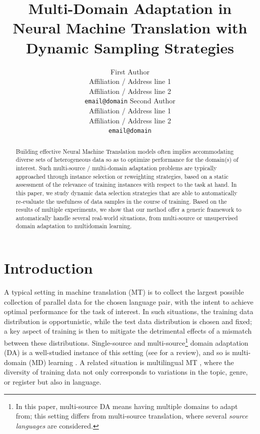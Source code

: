 \documentclass[11pt]{article}
\title{Multi-Domain Adaptation in Neural Machine Translation with Dynamic Sampling Strategies}
\author{First Author\\
  Affiliation / Address line 1\\
  Affiliation / Address line 2\\
  {\tt email@domain}  \And
  Second Author\\
  Affiliation / Address line 1\\
  Affiliation / Address line 2\\
  {\tt email@domain}}
\date{}
\newcommand{\fyDone}[1]{\done[FY]\Todo[FY:]{\textcolor{orange}{#1}}}
\newcommand{\revision}[1]{\textcolor{red}{#1}}
\begin{document}
\maketitle
\setlength{\abovedisplayskip}{2pt}
\setlength{\belowdisplayskip}{2pt}
\begin{abstract}
  Building effective Neural Machine Translation models often implies accommodating diverse sets of heterogeneous data so as to optimize performance for the domain(s) of interest. Such multi-source / multi-domain adaptation problems are typically approached through instance selection or reweighting strategies, based on a static assessment of the relevance of training instances with respect to the task at hand. In this paper, we study dynamic data selection strategies that are able to automatically re-evaluate the usefulness of data samples
  in the course of training. Based on the results of multiple experiments, we show that our method offer a generic framework to automatically
  handle several real-world situations, from multi-source or unsupervised domain adaptation to multidomain learning.
\end{abstract}

\section{Introduction}\label{sec:intro}
A typical setting in machine translation (MT) is to collect the largest possible collection of parallel data for the chosen language pair, with the intent to achieve optimal performance for the task of interest. In such situations, the training data distribution is opportunistic, while the test data distribution is chosen and fixed; a key aspect of training is then to mitigate the detrimental effects of a mismatch between these distributions. Single-source and multi-source\footnote{In this paper, multi-source DA means having multiple domains to adapt from; this setting differs from multi-source translation, where several \emph{source languages} are considered.} domain adaptation (DA) is a well-studied instance of this setting (see  for a review), and so is multi-domain (MD) learning \cite{Chu18multilingual,Zeng18multidomain,Jiang19multidomain,Pham21revisiting}. A related situation is multilingual MT \cite{Firat16multiway,Ha16towards,Johnson17google,Aharoni19massively},\fyDone{Fix ref}
where the diversity of training data not only corresponds to variations in the topic, genre, or register but also in language.
\end{document}
